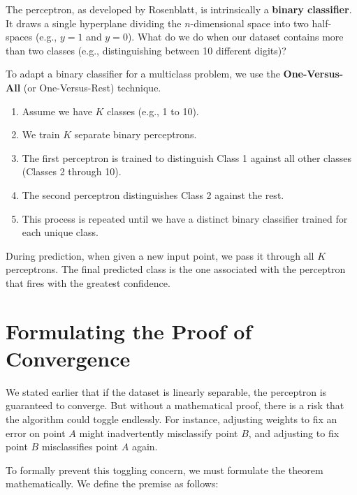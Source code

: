 The perceptron, as developed by Rosenblatt, is intrinsically a \textbf{binary classifier}. It draws a single hyperplane dividing the $n$-dimensional space into two half-spaces (e.g., $y=1$ and $y=0$). What do we do when our dataset contains more than two classes (e.g., distinguishing between 10 different digits)?

To adapt a binary classifier for a multiclass problem, we use the \textbf{One-Versus-All} (or One-Versus-Rest) technique. 

\begin{enumerate}
    \item Assume we have $K$ classes (e.g., 1 to 10).
    \item We train $K$ separate binary perceptrons. 
    \item The first perceptron is trained to distinguish Class 1 against all other classes (Classes 2 through 10).
    \item The second perceptron distinguishes Class 2 against the rest.
    \item This process is repeated until we have a distinct binary classifier trained for each unique class.
\end{enumerate}

During prediction, when given a new input point, we pass it through all $K$ perceptrons. The final predicted class is the one associated with the perceptron that fires with the greatest confidence.


\section{Formulating the Proof of Convergence}

We stated earlier that if the dataset is linearly separable, the perceptron is guaranteed to converge. But without a mathematical proof, there is a risk that the algorithm could toggle endlessly. For instance, adjusting weights to fix an error on point $A$ might inadvertently misclassify point $B$, and adjusting to fix point $B$ misclassifies point $A$ again.

To formally prevent this toggling concern, we must formulate the theorem mathematically. We define the premise as follows:

